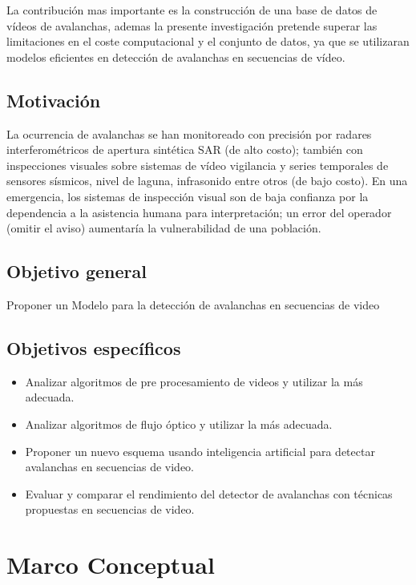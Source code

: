 \documentclass[a4paper,11pt]{report}
\begin{document}
 La contribución mas importante es la construcción de una base de datos de vídeos de avalanchas, ademas   la presente investigación pretende  superar las limitaciones en el coste computacional y el conjunto de datos, ya que se utilizaran modelos eficientes en detección de avalanchas en secuencias de vídeo.

\section{Motivación}


La ocurrencia de avalanchas se han monitoreado con precisión por radares interferométricos de apertura sintética SAR (de alto costo); también con inspecciones visuales sobre sistemas de vídeo vigilancia y series temporales de sensores sísmicos, nivel de laguna, infrasonido entre otros (de bajo costo). En una emergencia, los sistemas de inspección visual son de baja confianza por la dependencia a la asistencia humana para interpretación; un error del operador (omitir el aviso) aumentaría la vulnerabilidad de una población.


\section{Objetivo general}
Proponer un Modelo para la detección de avalanchas en secuencias de video


\section{Objetivos específicos}
\begin{itemize}
	\item Analizar algoritmos de pre procesamiento de videos y utilizar la más adecuada.
	

	\item Analizar algoritmos de flujo óptico y utilizar la más adecuada.
	
	\item Proponer un nuevo esquema usando inteligencia artificial  para detectar avalanchas en secuencias de video. 
	
	\item Evaluar y comparar el rendimiento del detector de avalanchas con técnicas propuestas  en secuencias de video.
	
	
	
\end{itemize}
\chapter{Marco Conceptual}
\end{document}
